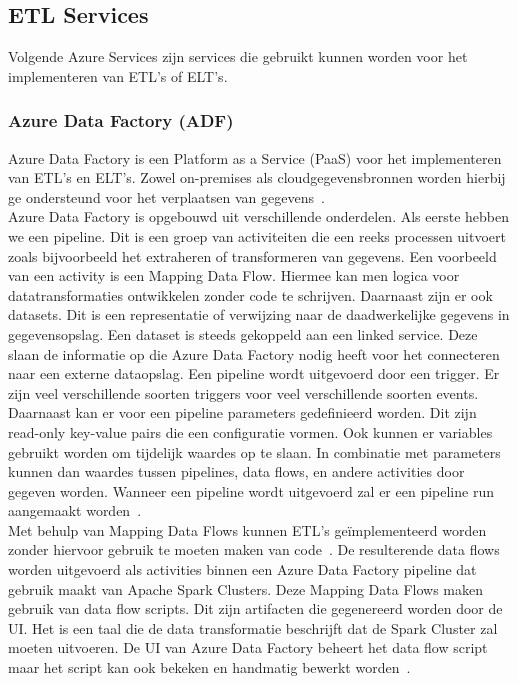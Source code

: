 \subsection{ETL Services}

Volgende Azure Services zijn services die gebruikt kunnen worden voor het implementeren van ETL's of ELT's.

\subsubsection{Azure Data Factory (ADF)}

Azure Data Factory is een Platform as a Service (PaaS) voor het implementeren van ETL's en ELT's. Zowel on-premises als cloudgegevensbronnen worden hierbij ge ondersteund voor het verplaatsen van gegevens~\autocite{Rawat2019}.\\


Azure Data Factory is opgebouwd uit verschillende onderdelen. Als eerste hebben we een pipeline. Dit is een groep van activiteiten die een reeks processen uitvoert zoals bijvoorbeeld het extraheren of transformeren van gegevens. Een voorbeeld van een activity is een Mapping Data Flow. Hiermee kan men logica voor datatransformaties ontwikkelen zonder code te schrijven. Daarnaast zijn er ook datasets. Dit is een representatie of verwijzing naar de daadwerkelijke gegevens in gegevensopslag. Een dataset is steeds gekoppeld aan een linked service. Deze slaan de informatie op die Azure Data Factory nodig heeft voor het connecteren naar een externe dataopslag. Een pipeline wordt uitgevoerd door een trigger. Er zijn veel verschillende soorten triggers voor veel verschillende soorten events. Daarnaast kan er voor een pipeline parameters gedefinieerd worden. Dit zijn read-only key-value pairs die een configuratie vormen. Ook kunnen er variables gebruikt worden om tijdelijk waardes op te slaan. In combinatie met parameters kunnen dan waardes tussen pipelines, data flows, en andere activities door gegeven worden. Wanneer een pipeline wordt uitgevoerd zal er een pipeline run aangemaakt worden~\autocite{Microsoft2024a}.\\


Met behulp van Mapping Data Flows kunnen ETL's geïmplementeerd worden zonder hiervoor gebruik te moeten maken van code~\autocite{Kromer2022}. De resulterende data flows worden uitgevoerd als activities binnen een Azure Data Factory pipeline dat gebruik maakt van Apache Spark Clusters. Deze Mapping Data Flows maken gebruik van data flow scripts. Dit zijn artifacten die gegenereerd worden door de UI. Het is een taal die de data transformatie beschrijft dat de Spark Cluster zal moeten uitvoeren. De UI van Azure Data Factory beheert het data flow script maar het script kan ook bekeken en handmatig bewerkt worden~\autocite{Kromer2022a}.

